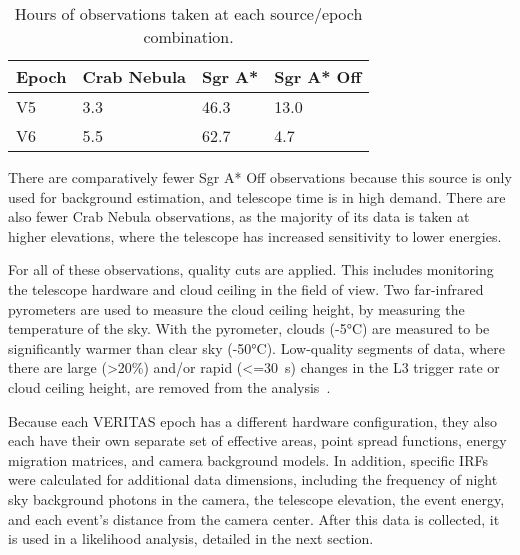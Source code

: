   \begin{table}[!ht]
    \centering
    \caption{Hours of observations taken at each source/epoch combination.}
    \label{tab:observation_times}
    \begin{tabular}{|l|l|l|l|}
      \hline
      \textbf{Epoch} & \textbf{Crab Nebula} & \textbf{Sgr A*} & \textbf{Sgr A* Off} \\ \hline
      V5             & 3.3                  & 46.3            & 13.0                \\ \hline
      V6             & 5.5                  & 62.7            & 4.7                 \\ \hline
    \end{tabular}
  \end{table}


  There are comparatively fewer Sgr A* Off observations because this source is only used for background estimation, and telescope time is in high demand.
  There are also fewer Crab Nebula observations, as the majority of its data is taken at higher elevations, where the telescope has increased sensitivity to lower energies.
  
  For all of these observations, quality cuts are applied.
  This includes monitoring the telescope hardware and cloud ceiling in the field of view.
  Two far-infrared pyrometers are used to measure the cloud ceiling height, by measuring the temperature of the sky.
  With the pyrometer, clouds (\nicetilde\ang{-5}C) are measured to be significantly warmer than clear sky (\nicetilde\ang{-50}C).
  Low-quality segments of data, where there are large (>20\%) and/or rapid (<=\SI{30}{s}) changes in the L3 trigger rate or cloud ceiling height, are removed from the analysis~\cite{bird_weather}.

  Because each VERITAS epoch has a different hardware configuration, they also each have their own separate set of effective areas, point spread functions, energy migration matrices, and camera background models.
  In addition, specific IRFs were calculated for additional data dimensions, including the frequency of night sky background photons in the camera, the telescope elevation, the event energy, and each event's distance from the camera center.
  After this data is collected, it is used in a likelihood analysis, detailed in the next section.


